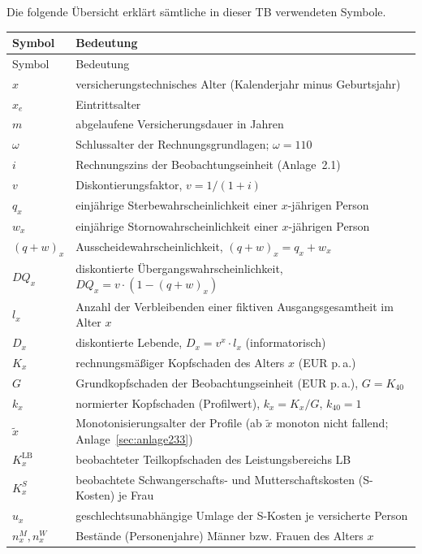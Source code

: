 Die folgende Übersicht erklärt sämtliche in dieser TB verwendeten Symbole.

\begin{center}\small
\begin{longtable}{@{}lp{13.5cm}@{}}
\toprule
Symbol & Bedeutung \\
\midrule
\endfirsthead
\toprule
Symbol & Bedeutung \\
\midrule
\endhead
\bottomrule
\endfoot
$x$ & versicherungstechnisches Alter (Kalenderjahr minus Geburtsjahr) \\
$x_e$ & Eintrittsalter \\
$m$ & abgelaufene Versicherungsdauer in Jahren \\
$\omega$ & Schlussalter der Rechnungsgrundlagen; $\omega = 110$ \\
$i$ & Rechnungszins der Beobachtungseinheit (Anlage~2.1) \\
$v$ & Diskontierungsfaktor, $v = 1/(1+i)$ \\
$q_x$ & einjährige Sterbewahrscheinlichkeit einer $x$-jährigen Person \\
$w_x$ & einjährige Stornowahrscheinlichkeit einer $x$-jährigen Person \\
$(q+w)_x$ & Ausscheidewahrscheinlichkeit, $(q+w)_x = q_x + w_x$ \\
$DQ_x$ & diskontierte Übergangswahrscheinlichkeit, $DQ_x = v\cdot(1-(q+w)_x)$ \\
$l_x$ & Anzahl der Verbleibenden einer fiktiven Ausgangsgesamtheit im Alter $x$ \\
$D_x$ & diskontierte Lebende, $D_x = v^x\cdot l_x$ (informatorisch) \\
$K_x$ & rechnungsmäßiger Kopfschaden des Alters $x$ (EUR p.\,a.) \\
$G$ & Grundkopfschaden der Beobachtungseinheit (EUR p.\,a.), $G = K_{40}$ \\
$k_x$ & normierter Kopfschaden (Profilwert), $k_x = K_x / G$, $k_{40}=1$ \\
$\tilde{x}$ & Monotonisierungsalter der Profile (ab $\tilde{x}$ monoton nicht fallend; Anlage~\ref{sec:anlage233}) \\
$K_x^{\mathrm{LB}}$ & beobachteter Teilkopfschaden des Leistungsbereichs LB \\
$K_x^{S}$ & beobachtete Schwangerschafts- und Mutterschaftskosten (S-Kosten) je Frau \\
$u_x$ & geschlechtsunabhängige Umlage der S-Kosten je versicherte Person \\
$n_x^{M}, n_x^{W}$ & Bestände (Personenjahre) Männer bzw. Frauen des Alters $x$ \\

\end{longtable}
\end{center}
